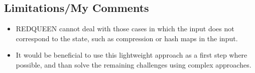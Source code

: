 \documentclass[]{article} %
\begin{document}
\subsection{Limitations/My Comments}
\begin{itemize}
    \item REDQUEEN cannot deal with those cases in which the input does not correspond to the state, such as compression or hash maps in the input.
    \item It would be beneficial to use this
lightweight approach as a first step where possible, and than
solve the remaining challenges using complex approaches.
\end{itemize}
\end{document}
